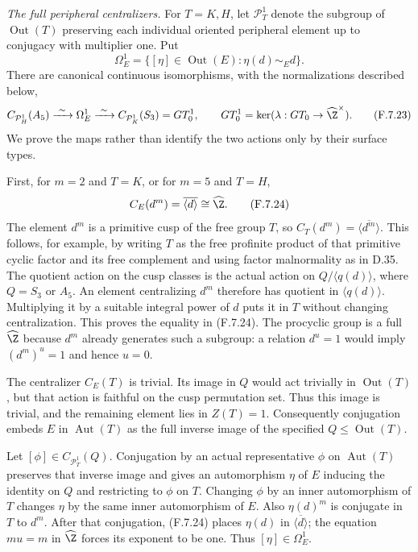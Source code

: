 \emph{The full peripheral centralizers.}
For $T=K,H$, let $\mathcal P_T^1$ denote the subgroup
of $\operatorname{Out}(T)$ preserving each individual
oriented peripheral element up to conjugacy with
multiplier one.  Put
\[
 \Omega_E^1=\{[\eta]\in\operatorname{Out}(E):
                         \eta(d)\sim_E d\}.
\]
There are canonical continuous isomorphisms, with
the normalizations described below,
\[
 C_{\mathcal P_H^1}(A_5)
       \xrightarrow{\ \sim\ }\Omega_E^1
       \xrightarrow{\ \sim\ }
 C_{\mathcal P_K^1}(S_3)=GT_0^1,
 \qquad GT_0^1=\ker(\lambda:GT_0\to\widehat\Z^\times).
                                                               \tag{F.7.23}
\]
We prove the maps rather than identify the two actions
only by their surface types.

First, for $m=2$ and $T=K$, or for $m=5$ and $T=H$,
\[
                         C_E(d^m)=\overline{\langle d\rangle}
                                      \cong\widehat\Z . 
                                                               \tag{F.7.24}
\]
The element $d^m$ is a primitive cusp of the free group
$T$, so $C_T(d^m)=\overline{\langle d^m\rangle}$.
This follows, for example, by writing $T$ as the
free profinite product of that primitive cyclic factor
and its free complement and using factor malnormality
as in D.35.  The quotient action on the cusp classes
is the actual action on
$Q/\langle q(d)\rangle$, where $Q=S_3$ or $A_5$.
An element centralizing $d^m$ therefore has quotient
in $\langle q(d)\rangle$.  Multiplying it by a suitable
integral power of $d$ puts it in $T$ without changing
centralization.  This proves the equality in (F.7.24).
The procyclic group is a full $\widehat\Z$ because
$d^m$ already generates such a subgroup: a relation
$d^u=1$ would imply $(d^m)^u=1$ and hence $u=0$.

The centralizer $C_E(T)$ is trivial.  Its image in
$Q$ would act trivially in $\operatorname{Out}(T)$,
but that action is faithful on the cusp permutation
set.  Thus this image is trivial, and the remaining
element lies in $Z(T)=1$.
Consequently conjugation embeds $E$ in
$\operatorname{Aut}(T)$ as the full inverse image
of the specified $Q\leq\operatorname{Out}(T)$.

Let $[\phi]\in C_{\mathcal P_T^1}(Q)$.
Conjugation by an actual representative $\phi$ on
$\operatorname{Aut}(T)$ preserves that inverse image
and gives an automorphism $\eta$ of $E$ inducing
the identity on $Q$ and restricting to $\phi$ on $T$.
Changing $\phi$ by an inner automorphism of $T$
changes $\eta$ by the same inner automorphism of $E$.
Also $\eta(d)^m$ is conjugate in $T$ to $d^m$.
After that conjugation, (F.7.24) places $\eta(d)$
in $\overline{\langle d\rangle}$; the equation
$m u=m$ in $\widehat\Z$ forces its exponent to be
one.  Thus $[\eta]\in\Omega_E^1$.

